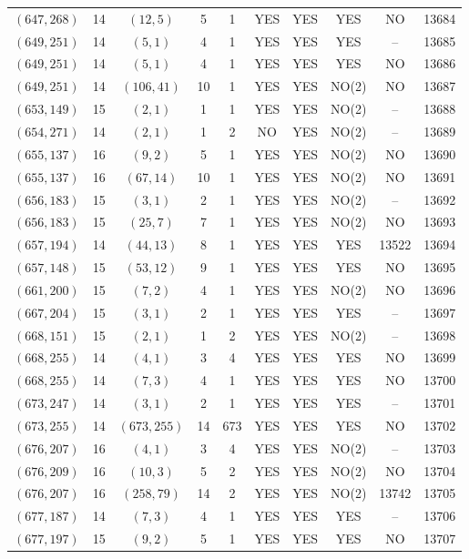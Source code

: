 \begin{longtable}{|c|c|c|c|c|c|c|c|c|c|}
$(647, 268)$ & 14 & $(12, 5)$ & 5 & 1 & YES & YES & YES & NO & 13684\\
$(649, 251)$ & 14 & $(5, 1)$ & 4 & 1 & YES & YES & YES & -- & 13685\\
$(649, 251)$ & 14 & $(5, 1)$ & 4 & 1 & YES & YES & YES & NO & 13686\\
$(649, 251)$ & 14 & $(106, 41)$ & 10 & 1 & YES & YES & NO(2) & NO & 13687\\
$(653, 149)$ & 15 & $(2, 1)$ & 1 & 1 & YES & YES & NO(2) & -- & 13688\\
$(654, 271)$ & 14 & $(2, 1)$ & 1 & 2 & NO & YES & NO(2) & -- & 13689\\
$(655, 137)$ & 16 & $(9, 2)$ & 5 & 1 & YES & YES & NO(2) & NO & 13690\\
$(655, 137)$ & 16 & $(67, 14)$ & 10 & 1 & YES & YES & NO(2) & NO & 13691\\
$(656, 183)$ & 15 & $(3, 1)$ & 2 & 1 & YES & YES & NO(2) & -- & 13692\\
$(656, 183)$ & 15 & $(25, 7)$ & 7 & 1 & YES & YES & NO(2) & NO & 13693\\
$(657, 194)$ & 14 & $(44, 13)$ & 8 & 1 & YES & YES & YES & 13522 & 13694\\
$(657, 148)$ & 15 & $(53, 12)$ & 9 & 1 & YES & YES & YES & NO & 13695\\
$(661, 200)$ & 15 & $(7, 2)$ & 4 & 1 & YES & YES & NO(2) & NO & 13696\\
$(667, 204)$ & 15 & $(3, 1)$ & 2 & 1 & YES & YES & YES & -- & 13697\\
$(668, 151)$ & 15 & $(2, 1)$ & 1 & 2 & YES & YES & NO(2) & -- & 13698\\
$(668, 255)$ & 14 & $(4, 1)$ & 3 & 4 & YES & YES & YES & NO & 13699\\
$(668, 255)$ & 14 & $(7, 3)$ & 4 & 1 & YES & YES & YES & NO & 13700\\
$(673, 247)$ & 14 & $(3, 1)$ & 2 & 1 & YES & YES & YES & -- & 13701\\
$(673, 255)$ & 14 & $(673, 255)$ & 14 & 673 & YES & YES & YES & NO & 13702\\
$(676, 207)$ & 16 & $(4, 1)$ & 3 & 4 & YES & YES & NO(2) & -- & 13703\\
$(676, 209)$ & 16 & $(10, 3)$ & 5 & 2 & YES & YES & NO(2) & NO & 13704\\
$(676, 207)$ & 16 & $(258, 79)$ & 14 & 2 & YES & YES & NO(2) & 13742 & 13705\\
$(677, 187)$ & 14 & $(7, 3)$ & 4 & 1 & YES & YES & YES & -- & 13706\\
$(677, 197)$ & 15 & $(9, 2)$ & 5 & 1 & YES & YES & YES & NO & 13707\\

\end{longtable}
